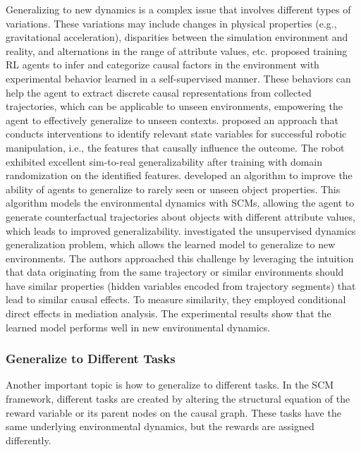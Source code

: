 \documentclass[10pt]{article} %
\theoremstyle{definition}
\begin{document}
Generalizing to new dynamics is a complex issue that involves different types of variations. These variations may include changes in physical properties (e.g., gravitational acceleration), disparities between the simulation environment and reality, and alternations in the range of attribute values, etc. \citet{sontakkeCausalCuriosityRL2021a} proposed training RL agents to infer and categorize causal factors in the environment with experimental behavior learned in a self-supervised manner. These behaviors can help the agent to extract discrete causal representations from collected trajectories, which can be applicable to unseen environments, empowering the agent to effectively generalize to unseen contexts. \citet{leeCausalReasoningSimulation2021a} proposed an approach that conducts interventions to identify relevant state variables for successful robotic manipulation, i.e., the features that causally influence the outcome. The robot exhibited excellent sim-to-real generalizability after training with domain randomization on the identified features. \citet{zhuCausalDynaImprovingGeneralization2021a} developed an algorithm to improve the ability of agents to generalize to rarely seen or unseen object properties. This algorithm models the environmental dynamics with SCMs, allowing the agent to generate counterfactual trajectories about objects with different attribute values, which leads to improved generalizability. \citet{guoRelationalInterventionApproach2022} investigated the unsupervised dynamics generalization problem, which allows the learned model to generalize to new environments. The authors approached this challenge by leveraging the intuition that data originating from the same trajectory or similar environments should have similar properties (hidden variables encoded from trajectory segments) that lead to similar causal effects. To measure similarity, they employed conditional direct effects in mediation analysis. The experimental results show that the learned model performs well in new environmental dynamics.

\subsubsection{Generalize to Different Tasks} 

Another important topic is how to generalize to different tasks. In the SCM framework, different tasks are created by altering the structural equation of the reward variable or its parent nodes on the causal graph. These tasks have the same underlying environmental dynamics, but the rewards are assigned differently.
\end{document}
